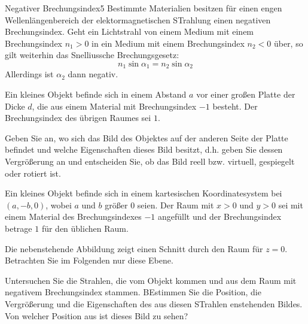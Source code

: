 \begin{problem}{Negativer Brechungsindex}{5}
Bestimmte Materialien besitzen für einen engen Wellenlängenbereich der elektormagnetischen STrahlung einen negativen Brechungsindex.  Geht ein Lichtstrahl von einem Medium mit einem Brechungsindex $n_1>0$ in ein Medium mit einem Brechungsindex $n_2<0$ über, so gilt weiterhin das Snelliussche Brechungsgesetz:
\begin{equation*}
  n_1\sin{\alpha_1}=n_2\sin{\alpha_2}
\end{equation*}
Allerdings ist $\alpha_2$ dann negativ.
\begin{abcenum}
  \item Ein kleines Objekt befinde sich in einem Abstand $a$ vor einer großen Platte der Dicke $d$, die aus einem Material mit Brechungsindex $-1$ besteht.  Der Brechungsindex des übrigen Raumes sei $1$.

Geben Sie an, wo sich das Bild des Objektes auf der anderen Seite der Platte befindet und welche Eigenschaften dieses Bild besitzt, d.h. geben Sie dessen Vergrößerung an und entscheiden Sie, ob das Bild reell bzw. virtuell, gespiegelt oder rotiert ist.
  \item Ein kleines Objekt befinde sich in einem kartesischen Koordinatesystem bei $(a,-b,0)$, wobei $a$ und $b$ größer $0$ seien.  Der Raum mit $x>0$ und $y>0$ sei mit einem Material des Brechungsindexes $-1$ angefüllt und der Brechungsindex betrage $1$ für den üblichen Raum.

Die nebenstehende Abbildung zeigt einen Schnitt durch den Raum für $z=0$.  Betrachten Sie im Folgenden nur diese Ebene.

Untersuchen Sie die Strahlen, die vom Objekt kommen und aus dem Raum mit negativem Brechungsindex stammen.  BEstimmen Sie die Position, die Vergrößerung und die Eigenschaften des aus diesen STrahlen enstehenden Bildes.  Von welcher Position aus ist dieses Bild zu sehen?
\end{abcenum}
  \begin{solution}
    
  \end{solution}
\end{problem}

